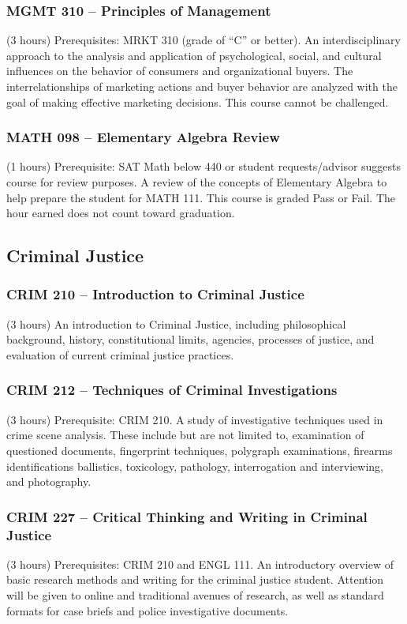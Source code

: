 \subsubsection{MGMT 310 -- Principles of Management}
(3 hours) Prerequisites: MRKT 310 (grade of “C” or better). An interdisciplinary approach to the analysis and application of psychological, social, and cultural influences on the behavior of consumers and organizational buyers. The interrelationships of marketing actions and buyer behavior are analyzed with the goal of making effective marketing decisions. This course cannot be challenged.

\subsubsection{MATH 098 -- Elementary Algebra Review}
(1 hours) Prerequisite: SAT Math below 440 or student requests/advisor suggests course for review purposes. A review of the concepts of Elementary Algebra to help prepare the student for MATH 111. This course is graded Pass or Fail. The hour earned does not count toward graduation.

\subsection{Criminal Justice}

\subsubsection{CRIM 210 -- Introduction to Criminal Justice}
(3 hours) An introduction to Criminal Justice, including philosophical background, history, constitutional limits, agencies, processes of justice, and evaluation of current criminal justice practices.

\subsubsection{CRIM 212 -- Techniques of Criminal Investigations}
(3 hours) Prerequisite: CRIM 210. A study of investigative techniques used in crime scene analysis. These include but are not limited to, examination of questioned documents, fingerprint techniques, polygraph examinations, firearms identifications ballistics, toxicology, pathology, interrogation and interviewing, and photography.

\subsubsection{CRIM 227 -- Critical Thinking and Writing in Criminal Justice}
(3 hours) Prerequisites: CRIM 210 and ENGL 111. An introductory overview of basic research methods and writing for the criminal justice student. Attention will be given to online and traditional avenues of research, as well as standard formats for case briefs and police investigative documents.

